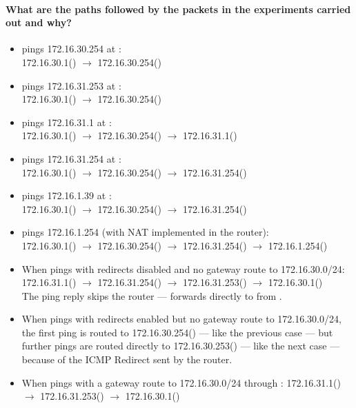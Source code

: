 \documentclass[compilation.tex]{subfiles}
\begin{document}
	\paragraph{What are the paths followed by the packets in the experiments carried out and why?}
	\begin{itemize}[noitemsep,leftmargin=*,topsep=0pt]
		\item {} pings 172.16.30.254 at :\\
		172.16.30.1() $\rightarrow$ 172.16.30.254()
		\item {} pings 172.16.31.253 at :\\
		172.16.30.1() $\rightarrow$ 172.16.30.254()
		\item {} pings 172.16.31.1 at :\\
		172.16.30.1() $\rightarrow$ 172.16.30.254() $\rightarrow$ 172.16.31.1()
		\item {} pings 172.16.31.254 at :\\
		172.16.30.1() $\rightarrow$ 172.16.30.254() $\rightarrow$ 172.16.31.254()
		\item {} pings 172.16.1.39 at :\\
		172.16.30.1() $\rightarrow$ 172.16.30.254() $\rightarrow$ 172.16.31.254()
		\item {} pings 172.16.1.254 (with NAT implemented in the router):\\
		172.16.30.1() $\rightarrow$ 172.16.30.254() $\rightarrow$ 172.16.31.254() $\rightarrow$ 172.16.1.254()
		\item When  pings  with redirects disabled and no gateway route to 172.16.30.0/24:
		172.16.31.1() $\rightarrow$ 172.16.31.254() $\rightarrow$ 172.16.31.253() $\rightarrow$ 172.16.30.1()\\
		The ping reply skips the router ---  forwards directly to  from .
		\item When  pings  with redirects enabled but no gateway route to 172.16.30.0/24, the first ping is routed to 172.16.30.254() --- like the previous case --- but further pings are routed directly to 172.16.30.253() --- like the next case --- because of the ICMP Redirect sent by the router.
		\item When  pings  with a gateway route to 172.16.30.0/24 through :
		172.16.31.1() $\rightarrow$ 172.16.31.253() $\rightarrow$ 172.16.30.1()
	\end{itemize}
	
\end{document}

